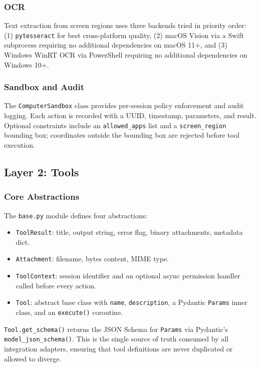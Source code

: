 \documentclass[11pt]{article}
\begin{document}
\subsubsection{OCR}

Text extraction from screen regions uses three backends tried in priority order: (1) \texttt{pytesseract} for best cross-platform quality, (2) macOS Vision via a Swift subprocess requiring no additional dependencies on macOS 11+, and (3) Windows WinRT OCR via PowerShell requiring no additional dependencies on Windows 10+.

\subsubsection{Sandbox and Audit}

The \texttt{ComputerSandbox} class provides per-session policy enforcement and audit logging. Each action is recorded with a UUID, timestamp, parameters, and result. Optional constraints include an \texttt{allowed\_apps} list and a \texttt{screen\_region} bounding box; coordinates outside the bounding box are rejected before tool execution.

\subsection{Layer 2: Tools}

\subsubsection{Core Abstractions}

The \texttt{base.py} module defines four abstractions:

\begin{itemize}
    \item \texttt{ToolResult}: title, output string, error flag, binary attachments, metadata dict.
    \item \texttt{Attachment}: filename, bytes content, MIME type.
    \item \texttt{ToolContext}: session identifier and an optional async permission handler called before every action.
    \item \texttt{Tool}: abstract base class with \texttt{name}, \texttt{description}, a Pydantic \texttt{Params} inner class, and an \texttt{execute()} coroutine.
\end{itemize}

\texttt{Tool.get\_schema()} returns the JSON Schema for \texttt{Params} via Pydantic's \texttt{model\_json\_schema()}. This is the single source of truth consumed by all integration adapters, ensuring that tool definitions are never duplicated or allowed to diverge.
\end{document}
